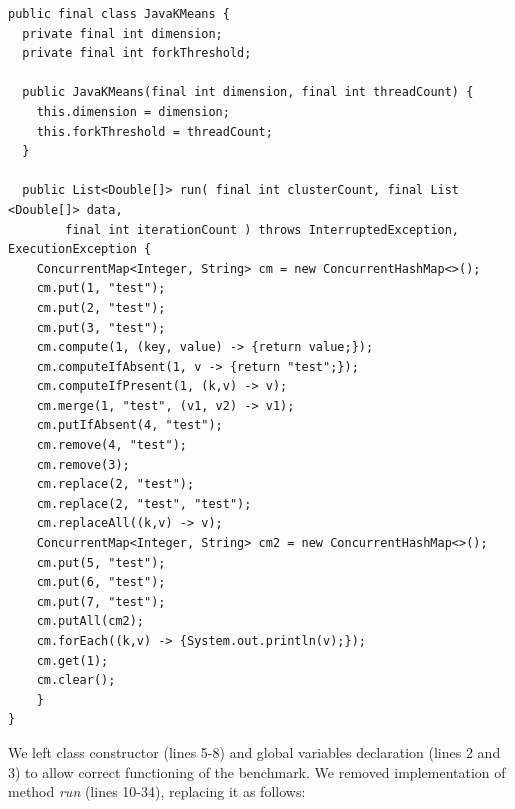 \documentclass[]{usiinfthesis}
\begin{document}
\vspace*{0.25cm}
        \begin{verbatim}
public final class JavaKMeans {
  private final int dimension;
  private final int forkThreshold;

  public JavaKMeans(final int dimension, final int threadCount) {
    this.dimension = dimension;
    this.forkThreshold = threadCount;
  }

  public List<Double[]> run( final int clusterCount, final List <Double[]> data, 
        final int iterationCount ) throws InterruptedException, ExecutionException {
    ConcurrentMap<Integer, String> cm = new ConcurrentHashMap<>();
    cm.put(1, "test");
    cm.put(2, "test");
    cm.put(3, "test");
    cm.compute(1, (key, value) -> {return value;});
    cm.computeIfAbsent(1, v -> {return "test";});
    cm.computeIfPresent(1, (k,v) -> v);
    cm.merge(1, "test", (v1, v2) -> v1);
    cm.putIfAbsent(4, "test");
    cm.remove(4, "test");
    cm.remove(3);
    cm.replace(2, "test");
    cm.replace(2, "test", "test");
    cm.replaceAll((k,v) -> v);
    ConcurrentMap<Integer, String> cm2 = new ConcurrentHashMap<>();
    cm.put(5, "test");
    cm.put(6, "test");
    cm.put(7, "test");
    cm.putAll(cm2);
    cm.forEach((k,v) -> {System.out.println(v);});
    cm.get(1);
    cm.clear();
    }
}
\end{verbatim}
\vspace*{0.25cm}
We left class constructor (lines 5-8) and global variables declaration (lines 2 and 3) to allow correct functioning of the benchmark. We removed implementation of method \textit{run} (lines 10-34), replacing it as follows:
\end{document}
